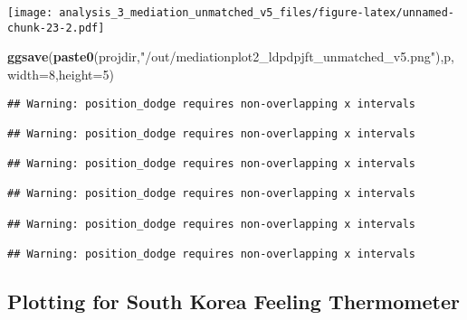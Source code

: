 \documentclass[
]{article}
\newenvironment{Shaded}{\begin{snugshade}}{\end{snugshade}}
\newcommand{\DataTypeTok}[1]{\textcolor[rgb]{0.13,0.29,0.53}{#1}}
\newcommand{\DecValTok}[1]{\textcolor[rgb]{0.00,0.00,0.81}{#1}}
\newcommand{\KeywordTok}[1]{\textcolor[rgb]{0.13,0.29,0.53}{\textbf{#1}}}
\newcommand{\NormalTok}[1]{#1}
\newcommand{\StringTok}[1]{\textcolor[rgb]{0.31,0.60,0.02}{#1}}
\begin{document}
\texttt{[image: analysis\_3\_mediation\_unmatched\_v5\_files/figure-latex/unnamed-chunk-23-2.pdf]}

\begin{Shaded}
\begin{Highlighting}[]
\KeywordTok{ggsave}\NormalTok{(}\KeywordTok{paste0}\NormalTok{(projdir,}\StringTok{"/out/mediationplot2_ldpdpjft_unmatched_v5.png"}\NormalTok{),p,}\DataTypeTok{width=}\DecValTok{8}\NormalTok{,}\DataTypeTok{height=}\DecValTok{5}\NormalTok{)}
\end{Highlighting}
\end{Shaded}

\begin{verbatim}
## Warning: position_dodge requires non-overlapping x intervals

## Warning: position_dodge requires non-overlapping x intervals

## Warning: position_dodge requires non-overlapping x intervals

## Warning: position_dodge requires non-overlapping x intervals

## Warning: position_dodge requires non-overlapping x intervals

## Warning: position_dodge requires non-overlapping x intervals
\end{verbatim}

\hypertarget{plotting-for-south-korea-feeling-thermometer}{%
\subsection{Plotting for South Korea Feeling
Thermometer}\label{plotting-for-south-korea-feeling-thermometer}}
\end{document}
